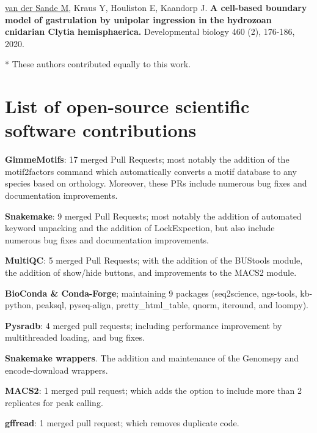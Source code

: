 \noindent
\underline{van der Sande M}, Kraus Y, Houliston E, Kaandorp J. \textbf{A cell-based boundary model of gastrulation by unipolar ingression in the hydrozoan cnidarian Clytia hemisphaerica.}  Developmental biology 460 (2), 176-186, 2020. \cite{vanderSande2020}
\newline

\noindent
* These authors contributed equally to this work.

\newpage
\section{List of open-source scientific software contributions}

\noindent
\textbf{GimmeMotifs}: 17 merged Pull Requests; most notably the addition of the motif2factors command which automatically converts a motif database to any species based on orthology. Moreover, these PRs include numerous bug fixes and documentation improvements.
\newline

\noindent
\textbf{Snakemake}: 9 merged Pull Requests; most notably the addition of automated keyword unpacking and the addition of LockExpection, but also include numerous bug fixes and documentation improvements.
\newline

\noindent
\textbf{MultiQC}: 5 merged Pull Requests; with the addition of the BUStools module, the addition of show/hide buttons, and improvements to the MACS2 module. 
\newline

\noindent
\textbf{BioConda \& Conda-Forge}; maintaining 9 packages (seq2science, ngs-tools, kb-python, peaksql, pyseq-align, pretty\_html\_table, qnorm, iteround, and loompy).
\newline

\noindent
\textbf{Pysradb}: 4 merged pull requests; including performance improvement by multithreaded loading, and bug fixes.
\newline

\noindent
\textbf{Snakemake wrappers}. The addition and maintenance of the Genomepy and encode-download wrappers.
\newline

\noindent
\textbf{MACS2}: 1 merged pull request; which adds the option to include more than 2 replicates for peak calling.
\newline

\noindent
\textbf{gffread}: 1 merged pull request; which removes duplicate code.
\newline

